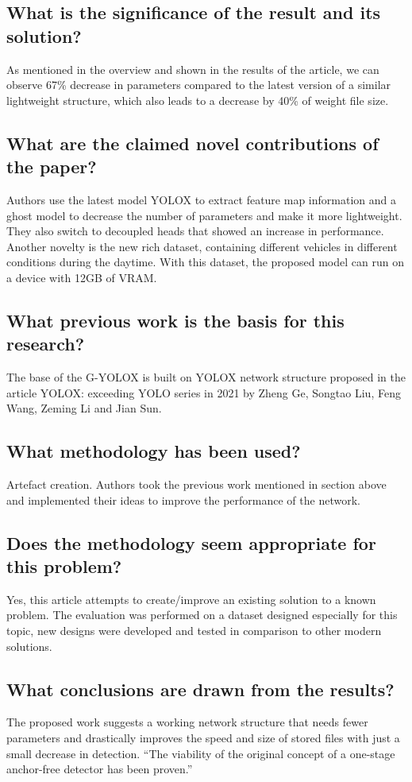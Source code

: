 \documentclass[11pt,a4paper]{article}
\begin{document}
\subsection*{What is the significance of the result and its solution?}
As mentioned in the overview and shown in the results of the article, we can observe 67\% decrease in parameters compared to the latest version of a similar lightweight structure, which also leads to a decrease by 40\% of weight file size.

\subsection*{What are the claimed novel contributions of the paper?}
Authors use the latest model YOLOX to extract feature map information and a ghost model to decrease the number of parameters and make it more lightweight. They also switch to decoupled heads that showed an increase in performance. Another novelty is the new rich dataset, containing different vehicles in different conditions during the daytime. With this dataset, the proposed model can run on a device with 12GB of VRAM.

\subsection*{What previous work is the basis for this research?}
The base of the G-YOLOX is built on YOLOX network structure proposed in the article YOLOX: exceeding YOLO series in 2021 by Zheng Ge, Songtao Liu, Feng Wang, Zeming Li and Jian Sun.

\subsection*{What methodology has been used?}
Artefact creation. Authors took the previous work mentioned in section above and implemented their ideas to improve the performance of the network.

\subsection*{Does the methodology seem appropriate for this problem?}
Yes, this article attempts to create/improve an existing solution to a known problem. The evaluation was performed on a dataset designed especially for this topic, new designs were developed and tested in comparison to other modern solutions.

\subsection*{What conclusions are drawn from the results?}
The proposed work suggests a working network structure that needs fewer parameters and drastically improves the speed and size of stored files with just a small decrease in detection. “The viability of the original concept of a one-stage anchor-free detector has been proven.”
\end{document}
